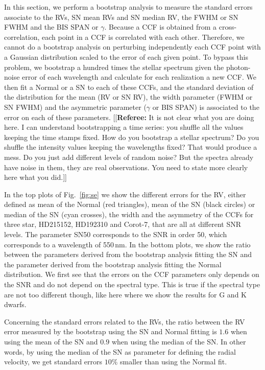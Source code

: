 \documentclass[11pt, oneside]{article}
\newcommand{\comment}[1]{{\color{red}[[\textbf{Referee: }#1]]}}
\begin{document}
In this section, we perform a bootstrap analysis to measure the standard errors associate to the RVs, SN mean RVs and SN median RV, the FWHM or SN FWHM and the BIS SPAN or $\gamma$. Because a CCF is obtained from a cross-correlation, each point in a CCF is correlated with each other. Therefore, we cannot do a bootstrap analysis on perturbing independently each CCF point with a Gaussian distribution scaled to the error of each given point. To bypass this problem, we bootstrap a hundred times the stellar spectrum given the photon-noise error of each wavelength and calculate for each realization a new CCF. We then fit a Normal or a SN to each of these CCFs, and the standard deviation of the distribution for the mean (RV or SN RV), the width parameter (FWHM or SN FWHM) and the asymmetric parameter ($\gamma$ or BIS SPAN) is associated to the error on each of these parameters.
\comment{It is not clear what you are doing here. I can understand bootstrapping a time series: you shuffle all the values keeping the time stamps fixed. How do you bootstrap a stellar spectrum? Do you shuffle the intensity values keeping the wavelengths fixed? That would produce a mess. Do you just add different levels of random noise? But the spectra already have noise in them, they are real observations. You need to state more clearly here what you did.}

In the top plots of Fig.~\ref{fig:se} we show the different errors for the RV, either defined as mean of the Normal (red triangles), mean of the SN (black circles) or median of the SN (cyan crosses), the width and the asymmetry of the CCFs for three star, HD215152, HD192310 and Corot-7, that are all at different SNR levels. The parameter SN50 corresponds to the SNR in order 50, which corresponds to a wavelength of 550\,nm. In the bottom plots, we show the ratio between the parameters derived from the bootstrap analysis fitting the SN and the parameter derived from the bootstrap analysis fitting the Normal distribution. We first see that the errors on the CCF parameters only depends on the SNR and do not depend on the spectral type. This is true if the spectral type are not too different though, like here where we show the results for G and K dwarfs.

Concerning the standard errors related to the RVs, the ratio between the RV error measured by the bootstrap using the SN and Normal fitting is $1.6$ when using the mean of the SN and $0.9$ when using the median of the SN. In other words, by using the median of the SN as parameter for defining the radial velocity, we get standard errors $10\%$ smaller than using the Normal fit. 
\end{document}
